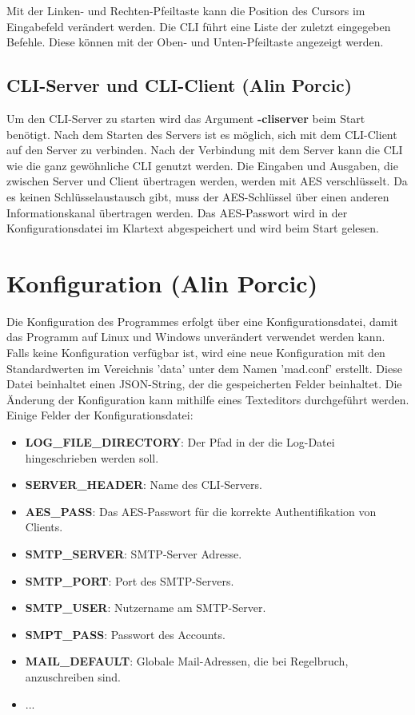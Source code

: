 \documentclass[12pt,a4paper]{report}
\begin{document}
Mit der Linken- und Rechten-Pfeiltaste kann die Position des Cursors im Eingabefeld verändert werden. Die CLI führt eine Liste der zuletzt eingegeben Befehle. Diese können mit der Oben- und Unten-Pfeiltaste angezeigt werden.

\section{CLI-Server und CLI-Client (Alin Porcic)}

Um den CLI-Server zu starten wird das Argument \textbf{-cliserver} beim Start benötigt. Nach dem Starten des Servers ist es möglich, sich mit dem CLI-Client auf den Server zu verbinden. Nach der Verbindung mit dem Server kann die CLI wie die ganz gewöhnliche CLI genutzt werden. Die Eingaben und Ausgaben, die zwischen Server und Client übertragen werden, werden mit AES verschlüsselt. Da es keinen Schlüsselaustausch gibt, muss der AES-Schlüssel über einen anderen Informationskanal übertragen werden. Das AES-Passwort wird in der Konfigurationsdatei im Klartext abgespeichert und wird beim Start gelesen.

\chapter{Konfiguration (Alin Porcic)}

Die Konfiguration des Programmes erfolgt über eine Konfigurationsdatei, damit das Programm auf Linux und Windows unverändert verwendet werden kann. Falls keine Konfiguration verfügbar ist, wird eine neue Konfiguration mit den Standardwerten im Vereichnis 'data' unter dem Namen 'mad.conf' erstellt. Diese Datei  beinhaltet einen JSON-String, der die gespeicherten Felder beinhaltet. Die Änderung der Konfiguration kann mithilfe eines Texteditors durchgeführt werden. Einige Felder der Konfigurationsdatei:

\begin{itemize}
\item \textbf{LOG\_FILE\_DIRECTORY}: Der Pfad in der die Log-Datei hingeschrieben werden soll.
\item \textbf{SERVER\_HEADER}: Name des CLI-Servers.
\item \textbf{AES\_PASS}: Das AES-Passwort für die korrekte Authentifikation von Clients.
\item \textbf{SMTP\_SERVER}: SMTP-Server Adresse.
\item \textbf{SMTP\_PORT}: Port des SMTP-Servers.
\item \textbf{SMTP\_USER}: Nutzername am SMTP-Server.
\item \textbf{SMPT\_PASS}: Passwort des Accounts.
\item \textbf{MAIL\_DEFAULT}: Globale Mail-Adressen, die bei Regelbruch, anzuschreiben sind.
\item ...
\end{itemize}
\end{document}

